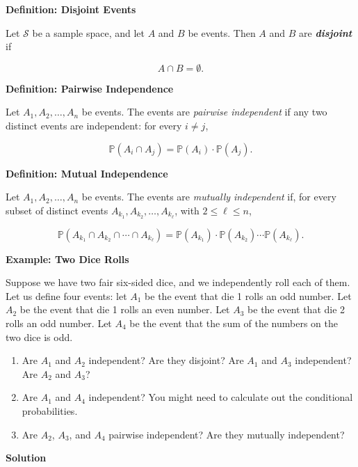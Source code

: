 \documentclass[11pt,letterpaper]{article}
\newcommand{\blocktitle}[1]{\par\addvspace{9pt}\noindent\textbf{#1}\par\nopagebreak\vspace{2pt}\nopagebreak}
\begin{document}
\blocktitle{Definition: Disjoint Events}

Let $\mathcal S$ be a sample space, and let $A$ and $B$ be events. Then $A$ and $B$ are \emph{\textbf{disjoint}} if

\[
A \cap B = \emptyset.
\]

\blocktitle{Definition: Pairwise Independence}

Let $A_1, A_2, \ldots, A_n$ be events. The events are \emph{pairwise independent} if any two distinct events are independent: for every $i \ne j$,

\[
\mathbb P(A_i \cap A_j) = \mathbb P(A_i) \cdot \mathbb P(A_j).
\]

\blocktitle{Definition: Mutual Independence}

Let $A_1, A_2, \ldots, A_n$ be events. The events are \emph{mutually independent} if, for every subset of distinct events $A_{k_1}, A_{k_2}, \ldots, A_{k_\ell}$, with $2 \leq \ell \leq n$,

\[
\mathbb P(A_{k_1} \cap A_{k_2} \cap \cdots \cap A_{k_\ell}) = \mathbb P(A_{k_1}) \cdot \mathbb P(A_{k_2}) \cdots \mathbb P(A_{k_\ell}).
\]

\blocktitle{Example: Two Dice Rolls}

Suppose we have two fair six-sided dice, and we independently roll each of them. Let us define four events: let $A_1$ be the event that die 1 rolls an odd number. Let $A_2$ be the event that die 1 rolls an even number. Let $A_3$ be the event that die 2 rolls an odd number. Let $A_4$ be the event that the sum of the numbers on the two dice is odd.

\begin{enumerate}[label=\alph*.]

  
\item Are $A_1$ and $A_2$ independent? Are they disjoint? Are $A_1$ and $A_3$ independent? Are $A_2$ and $A_3$?

  
\item Are $A_1$ and $A_4$ independent? You might need to calculate out the conditional probabilities.

  
\item Are $A_2$, $A_3$, and $A_4$ pairwise independent? Are they mutually independent?

\end{enumerate}

\clearpage
\blocktitle{Solution}
\end{document}
